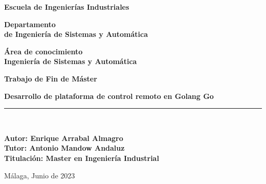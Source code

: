 \begin{center}
	\begin{large}
		\textbf {Escuela de Ingenierías Industriales\\}
	\end{large}	
	\vspace*{0.5cm}
	\begin{large}
		\textbf {Departamento\\ de Ingeniería de Sistemas y Automática\\}
	\end{large}	
	\vspace*{1cm}
	\begin{large}
		\textbf {Área de conocimiento\\Ingeniería de Sistemas y Automática\\}
	\end{large}	
	\vspace*{1cm}	
	\begin{Huge}
		\textbf {Trabajo de Fin de Máster\\}
	\end{Huge}
	\vspace*{0.3cm}
	\begin{LARGE}
		\textbf {Desarrollo de plataforma de control remoto en Golang Go\\}
	\end{LARGE}
	\vspace*{0.3cm}
	\rule{5cm}{0.01cm}\\
	\vspace*{1cm}
	\begin{large}
		\textbf {Autor: Enrique Arrabal Almagro\\}
		\vspace*{0.5cm}
		\textbf {Tutor: Antonio Mandow Andaluz\\}
		\vspace*{1cm}
		\textbf{Titulación: Master en Ingeniería Industrial}
	\end{large}	
	\vspace*{3cm}
\begin{center}
\textbf{}{Málaga, Junio de 2023}
\end{center}					
\end{center}
\thispagestyle{empty}

